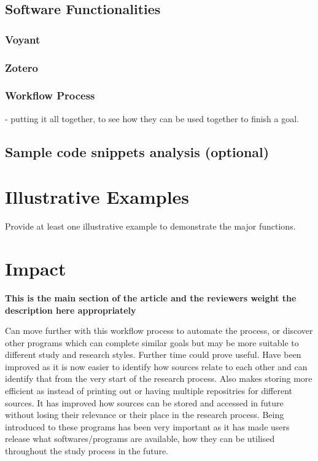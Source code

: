 \documentclass[preprint,12pt, a4paper]{elsarticle}
\begin{document}
\subsection{Software Functionalities}
\label{}
\subsubsection{Voyant}
\subsubsection{Zotero}
\subsubsection{Workflow Process}
- putting it all together, to see how they can be used together to finish a goal.


\subsection{Sample code snippets analysis (optional)}
\label{}

\section{Illustrative Examples}
\label{}

Provide at least one illustrative example to demonstrate the major functions.


\section{Impact}
\label{}

\textbf{This is the main section of the article and the reviewers weight the description here appropriately}

Can move further with this workflow process to automate the process, or discover other programs which can complete similar goals but may be more suitable to different study and research styles. Further time could prove useful.
Have been improved as it is now easier to identify how sources relate to each other and can identify that from the very start of the research process. Also makes storing more efficient as instead of printing out or having multiple repositries for different sources. It has improved how sources can be stored and accessed in future without losing their relevance or their place in the research process.
Being introduced to these programs has been very important as it has made users release what softwares/programs are available, how they can be utilised throughout the study process in the future.
\end{document}
